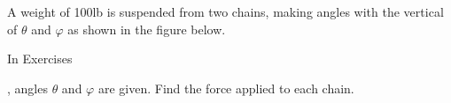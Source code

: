 {\noindent A weight of 100lb is suspended from two chains, making angles with the vertical of $\theta$ and $\varphi$ as shown in the figure below.
\begin{center}
\end{center}
In Exercises}
{,  angles $\theta$ and $\varphi$ are given. Find the force applied to each chain.
}
